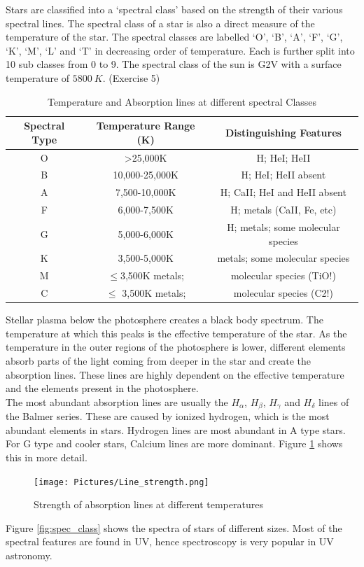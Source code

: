 \documentclass[12pt,a4paper]{article}
\begin{document}
    Stars are classified into a `spectral class' based on the strength of their various spectral lines. The spectral class of a star is also a direct measure of the temperature of the star. The spectral classes are labelled
    `O', `B', `A', `F', `G', `K', `M', `L' and `T' in decreasing order of temperature. Each is further split into 10 sub classes from 0 to 9. The spectral class of the sun is G2V with a surface temperature of $5800~K$. (Exercise 5) \\
    \begin{table}[H]
      \begin{tabular}{||c|c|c||}
        \hline
        Spectral Type & Temperature Range (K) & Distinguishing Features\\
        \hline
        \hline
        O	& \textgreater 25,000K	&H; HeI; HeII\\
        B	&10,000-25,000K	&H; HeI; HeII absent\\
        A	&7,500-10,000K	&H; CaII; HeI and HeII absent\\
        F	&6,000-7,500K	  &H; metals (CaII, Fe, etc)\\
        G	&5,000-6,000K  	&H; metals; some molecular species\\
        K	&3,500-5,000K	  &metals; some molecular species\\
        M	&$\leq $3,500K	metals;& molecular species (TiO!)\\
        C	&$\leq $ 3,500K	metals; &molecular species (C2!)\\
        \hline
      \end{tabular}
      \caption{Temperature and Absorption lines at different spectral Classes\cite{Spectral_Classification}}
    \end{table} 
    Stellar plasma below the photosphere creates a black body spectrum. The temperature at which this peaks is the effective temperature of the star. As the temperature in the outer regions of the photosphere is lower,
    different elements absorb parts of the light coming from deeper in the star and create the absorption lines. These lines are highly dependent on the effective temperature and the elements present in the photosphere.
    \\
    The most abundant absorption lines are usually the $H_\alpha$, $H_\beta$, $H_\gamma$ and $H_\delta$ lines of the Balmer series. These are caused by ionized hydrogen, which is the most abundant elements in stars.
    Hydrogen lines are most abundant in A type stars. For G type and cooler stars, Calcium lines are more dominant. Figure \ref{fig:abs_lines} shows this in more detail.
    \begin{figure}[H]
      \centering
      \texttt{[image: Pictures/Line\_strength.png]}
      \caption{Strength of absorption lines at different temperatures}
      \label{fig:abs_lines}
    \end{figure}
    Figure \ref{fig:spec_class} shows the spectra of stars of different sizes. Most of the spectral features are found in UV, hence spectroscopy is very popular in UV astronomy. 
    
\end{document}
